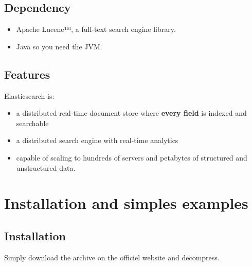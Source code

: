 \documentclass[]{beamer}
\begin{document}
\subsection{Dependency}

\begin{frame}{\subsecname{}}
  \begin{itemize}
    \item Apache Lucene™, a full-text search engine library.
    \item Java so you need the JVM.
  \end{itemize}
\end{frame}

\subsection{Features}

\begin{frame}{\subsecname{}}
  Elasticsearch is:
  \begin{itemize}
    \item a distributed real-time document store where \textbf{every field} is indexed and searchable
    \item a distributed search engine with real-time analytics
    \item capable of scaling to hundreds of servers and petabytes of structured and unstructured data.
  \end{itemize}
\end{frame}

\section{Installation and simples examples}

\subsection{Installation}

\begin{frame}{\subsecname{}}
  Simply download the archive on the officiel website and decompress.
\end{frame}
\end{document}
